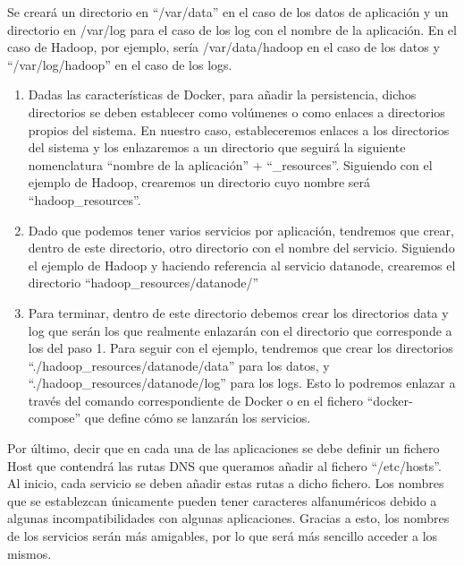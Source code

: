 Se creará un directorio en “/var/data” en el caso de los datos de aplicación y un directorio en /var/log para el caso de los log con el nombre de la aplicación. En el caso de Hadoop, por ejemplo, sería     /var/data/hadoop en el caso de los datos y “/var/log/hadoop” en el caso de los logs.
\begin{enumerate}

\item Dadas las características de Docker, para añadir la persistencia, dichos directorios se deben establecer como volúmenes o como enlaces a directorios propios del sistema. En nuestro caso, estableceremos enlaces a los directorios del sistema y los enlazaremos a un directorio que seguirá la siguiente nomenclatura “nombre de la aplicación” + “\_resources”. Siguiendo con el ejemplo de Hadoop, crearemos un directorio cuyo nombre será     “hadoop\_resources”.         

\item Dado que podemos tener varios servicios por aplicación, tendremos que crear, dentro de este directorio, otro directorio con el nombre del servicio. Siguiendo el ejemplo de Hadoop y haciendo referencia al servicio datanode, crearemos el directorio “hadoop\_resources/datanode/”

\item Para terminar, dentro de este directorio debemos crear los directorios data y log que serán los que realmente enlazarán con el directorio que corresponde a los del paso 1. Para seguir con el ejemplo, tendremos que crear los directorios “./hadoop\_resources/datanode/data” para los datos, y “./hadoop\_resources/datanode/log” para los logs. Esto lo podremos enlazar a través del comando correspondiente de Docker o en el fichero “docker-compose” que define cómo se lanzarán los servicios.

\end{enumerate}

Por último, decir que en cada una de las aplicaciones se debe definir un fichero Host que contendrá las rutas DNS que queramos añadir al fichero “/etc/hosts”. Al inicio, cada servicio se deben añadir estas rutas a dicho fichero. Los nombres que se establezcan únicamente pueden tener caracteres alfanuméricos debido a algunas incompatibilidades con algunas aplicaciones. Gracias a esto, los nombres de los servicios serán más amigables, por lo que será más sencillo acceder a los mismos.\par

